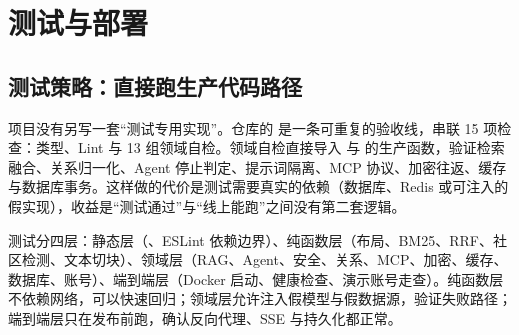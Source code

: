 \section{测试与部署}

\subsection{测试策略：直接跑生产代码路径}

项目没有另写一套“测试专用实现”。仓库的  是一条可重复的验收线，串联 15 项检查：类型、Lint 与 13 组领域自检。领域自检直接导入  与  的生产函数，验证检索融合、关系归一化、Agent 停止判定、提示词隔离、MCP 协议、加密往返、缓存与数据库事务。这样做的代价是测试需要真实的依赖（数据库、Redis 或可注入的假实现），收益是“测试通过”与“线上能跑”之间没有第二套逻辑。

测试分四层：静态层（、ESLint 依赖边界）、纯函数层（布局、BM25、RRF、社区检测、文本切块）、领域层（RAG、Agent、安全、关系、MCP、加密、缓存、数据库、账号）、端到端层（Docker 启动、健康检查、演示账号走查）。纯函数层不依赖网络，可以快速回归；领域层允许注入假模型与假数据源，验证失败路径；端到端层只在发布前跑，确认反向代理、SSE 与持久化都正常。

